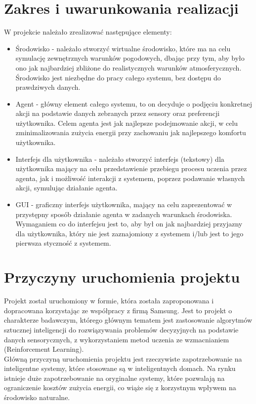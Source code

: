 \documentclass{article}
\begin{document}
\section{Zakres i uwarunkowania realizacji}
W projekcie należało zrealizować następujące elementy:
\begin{itemize}
\item Środowisko - należało stworzyć wirtualne środowisko, które ma na celu symulację zewnętrznych warunków pogodowych, dbając przy tym, aby było ono jak najbardziej zbliżone do realistycznych warunków atmosferycznych. Środowisko jest niezbędne do pracy całego systemu, bez dostępu do prawdziwych danych.
\item Agent - główny element całego systemu, to on decyduje o podjęciu konkretnej akcji na podstawie danych zebranych przez sensory oraz preferencji użytkownika. Celem agenta jest jak najlepsze podejmowanie akcji, w celu zminimalizowania zużycia energii przy zachowaniu jak najlepszego komfortu użytkownika.
\item Interfejs dla użytkownika  - należało stworzyć interfejs (tekstowy) dla użytkownika mający na celu przedstawienie przebiegu procesu uczenia przez agenta, jak i możliwość interakcji z systemem, poprzez podawanie własnych akcji, symulując działanie agenta.
\item GUI - graficzny interfejs użytkownika, mający na celu zaprezentować w przystępny sposób działanie agenta w zadanych warunkach środowiska. Wymaganiem co do interfejsu jest to, aby był on jak najbardziej przyjazny dla użytkownika, który nie jest zaznajomiony z systemem i/lub jest to jego pierwsza styczność z systemem.
\end{itemize}

\section{Przyczyny uruchomienia projektu}

Projekt został uruchomiony w formie, która została zaproponowana i dopracowana korzystając ze współpracy z firmą Samsung. Jest to projekt o charakterze badawczym, którego głównym tematem jest zastosowanie algorytmów sztucznej inteligencji do rozwiązywania problemów decyzyjnych na podstawie danych sensorycznych, z wykorzystaniem metod uczenia ze wzmacnianiem (Reinforcement Learning). \\
Główną przyczyną uruchomienia projektu jest rzeczywiste zapotrzebowanie na inteligentne systemy, które stosowane są w inteligentnych domach. Na rynku istnieje duże zapotrzebowanie na oryginalne systemy, które pozwalają na ograniczenie kosztów zużycia energii, co wiąże się  z korzystnym wpływem na środowisko naturalne.
\end{document}
